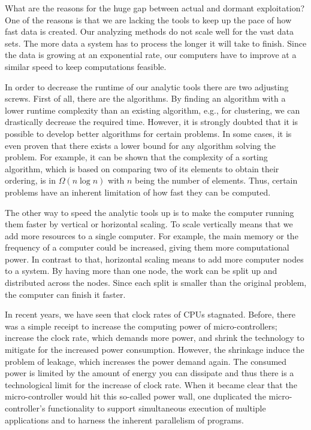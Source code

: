 What are the reasons for the huge gap between actual and dormant exploitation?
One of the reasons is that we are lacking the tools to keep up the pace of how fast data is created.
Our analyzing methods do not scale well for the vast data sets.
The more data a system has to process the longer it will take to finish.
Since the data is growing at an exponential rate, our computers have to improve at a similar speed to keep computations feasible.

In order to decrease the runtime of our analytic tools there are two adjusting screws.
First of all, there are the algorithms.
By finding an algorithm with a lower runtime complexity than an existing algorithm, e.g., for clustering, we can drastically decrease the required time.
However, it is strongly doubted that it is possible to develop better algorithms for certain problems.
In some cases, it is even proven that there exists a lower bound for any algorithm solving the problem.
For example, it can be shown that the complexity of a sorting algorithm, which is based on comparing two of its elements to obtain their ordering, is in $\Omega\left(n\log n\right)$ with $n$ being the number of elements.
Thus, certain problems have an inherent limitation of how fast they can be computed.

The other way to speed the analytic tools up is to make the computer running them faster by vertical or horizontal scaling.
To scale vertically means that we add more resources to a single computer.
For example, the main memory or the frequency of a computer could be increased, giving them more computational power.
In contrast to that, horizontal scaling means to add more computer nodes to a system.
By having more than one node, the work can be split up and distributed across the nodes.
Since each split is smaller than the original problem, the computer can finish it faster.

In recent years, we have seen that clock rates of CPUs stagnated.
Before, there was a simple receipt to increase the computing power of micro-controllers; increase the clock rate, which demands more power, and shrink the technology to mitigate for the increased power consumption.
However, the shrinkage induce the problem of leakage, which increases the power demand again.
The consumed power is limited by the amount of energy you can dissipate and thus there is a technological limit for the increase of clock rate.
When it became clear that the micro-controller would hit this so-called power wall, one duplicated the micro-controller's functionality to support simultaneous execution of multiple applications and to harness the inherent parallelism of programs.

